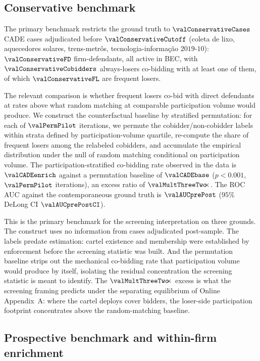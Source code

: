 \subsection{Conservative benchmark}
\label{sec:cade_contemporaneous}

The primary benchmark restricts the ground truth to
$\valConservativeCases$ CADE cases adjudicated before
$\valConservativeCutoff$ (coleta de lixo, aquecedores solares,
trens-metr\^os, tecnologia-informa\c{c}\~ao $2019$-$10$):
$\valConservativeFD$ firm-defendants, all active in BEC, with
$\valConservativeCobidders$ always-losers co-bidding with at
least one of them, of which $\valConservativeFL$ are frequent
losers.

The relevant comparison is whether frequent losers co-bid with
direct defendants at rates above what random matching at
comparable participation volume would produce. We construct the
counterfactual baseline by stratified permutation: for each of
$\valPermPilot$ iterations, we permute the cobidder/non-cobidder
labels within strata defined by participation-volume quartile,
re-compute the share of frequent losers among the relabeled
cobidders, and accumulate the empirical distribution under the
null of random matching conditional on participation volume.
The participation-stratified co-bidding rate observed in the
data is $\valCADEenrich$ against a permutation baseline of
$\valCADEbase$ ($p<0.001$, $\valPermPilot$ iterations), an
excess ratio of $\valMultThreeTwo\!\!\times$. The ROC AUC
against the contemporaneous ground truth is $\valAUCprePost$
($95\%$ DeLong CI $\valAUCprePostCI$).

This is the primary benchmark for the screening interpretation
on three grounds. The construct uses no information from cases
adjudicated post-sample. The labels predate estimation: cartel
existence and membership were established by enforcement before
the screening statistic was built. And the permutation baseline
strips out the mechanical co-bidding rate that participation
volume would produce by itself, isolating the residual
concentration the screening statistic is meant to identify. The
$\valMultThreeTwo\!\!\times$ excess is what the screening
framing predicts under the separating equilibrium of
Online Appendix~A: where the cartel deploys cover bidders, the
loser-side participation footprint concentrates above the
random-matching baseline.

\subsection{Prospective benchmark and within-firm enrichment}
\label{sec:cade_prospective}

